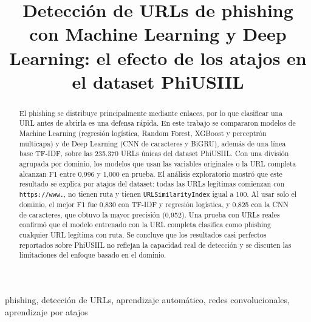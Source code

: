 \documentclass[conference]{IEEEtran}
\begin{document}
\title{Detección de URLs de phishing con Machine Learning y Deep Learning: el efecto de los atajos en el dataset PhiUSIIL}

\author{
\and
{}
}

\maketitle

\begin{abstract}
El phishing se distribuye principalmente mediante enlaces, por lo que clasificar una URL antes de abrirla es una defensa rápida. En este trabajo se compararon modelos de Machine Learning (regresión logística, Random Forest, XGBoost y perceptrón multicapa) y de Deep Learning (CNN de caracteres y BiGRU), además de una línea base TF-IDF, sobre las 235.370 URLs únicas del dataset PhiUSIIL. Con una división agrupada por dominio, los modelos que usan las variables originales o la URL completa alcanzan F1 entre 0,996 y 1,000 en prueba. El análisis exploratorio mostró que este resultado se explica por atajos del dataset: todas las URLs legítimas comienzan con \texttt{https://www.}, no tienen ruta y tienen \texttt{URLSimilarityIndex} igual a 100. Al usar solo el dominio, el mejor F1 fue 0,830 con TF-IDF y regresión logística, y 0,825 con la CNN de caracteres, que obtuvo la mayor precisión (0,952). Una prueba con URLs reales confirmó que el modelo entrenado con la URL completa clasifica como phishing cualquier URL legítima con ruta. Se concluye que los resultados casi perfectos reportados sobre PhiUSIIL no reflejan la capacidad real de detección y se discuten las limitaciones del enfoque basado en el dominio.
\end{abstract}

\begin{IEEEkeywords}
phishing, detección de URLs, aprendizaje automático, redes convolucionales, aprendizaje por atajos
\end{IEEEkeywords}







\end{document}
